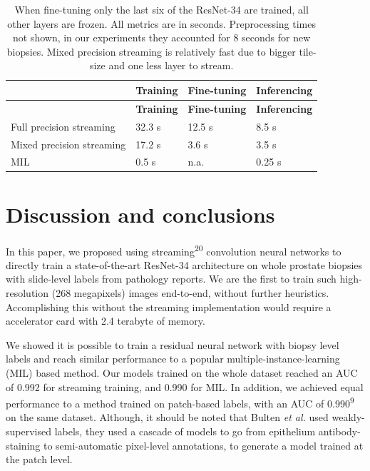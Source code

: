 \documentclass[
  12pt,
  a5,margin=2cmpaper,
]{article}
\begin{document}
\hypertarget{tab:times}{}
\begin{longtable}[]{@{}llll@{}}
\caption{When fine-tuning only the last six of the ResNet-34 are
trained, all other layers are frozen. All metrics are in seconds.
Preprocessing times not shown, in our experiments they accounted for 8
seconds for new biopsies. Mixed precision streaming is relatively fast
due to bigger tile-size and one less layer to stream.}\tabularnewline
\toprule\noalign{}
& \textbf{Training} & \textbf{Fine-tuning} & \textbf{Inferencing} \\
\midrule\noalign{}
\endfirsthead
\toprule\noalign{}
& \textbf{Training} & \textbf{Fine-tuning} & \textbf{Inferencing} \\
\midrule\noalign{}
\endhead
\bottomrule\noalign{}
\endlastfoot
Full precision streaming & 32.3 s & 12.5 s & 8.5 s \\
Mixed precision streaming & 17.2 s & 3.6 s & 3.5 s \\
MIL & 0.5 s & n.a. & 0.25 s \\
\end{longtable}

\hypertarget{discussion-and-conclusions}{%
\section{Discussion and conclusions}\label{discussion-and-conclusions}}

In this paper, we proposed using streaming\textsuperscript{20}
convolution neural networks to directly train a state-of-the-art
ResNet-34 architecture on whole prostate biopsies with slide-level
labels from pathology reports. We are the first to train such
high-resolution (268 megapixels) images end-to-end, without further
heuristics. Accomplishing this without the streaming implementation
would require a accelerator card with 2.4 terabyte of memory.

We showed it is possible to train a residual neural network with biopsy
level labels and reach similar performance to a popular
multiple-instance-learning (MIL) based method. Our models trained on the
whole dataset reached an AUC of 0.992 for streaming training, and 0.990
for MIL. In addition, we achieved equal performance to a method trained
on patch-based labels, with an AUC of 0.990\textsuperscript{9} on the
same dataset. Although, it should be noted that Bulten \emph{et al.}
used weakly-supervised labels, they used a cascade of models to go from
epithelium antibody-staining to semi-automatic pixel-level annotations,
to generate a model trained at the patch level.
\end{document}
